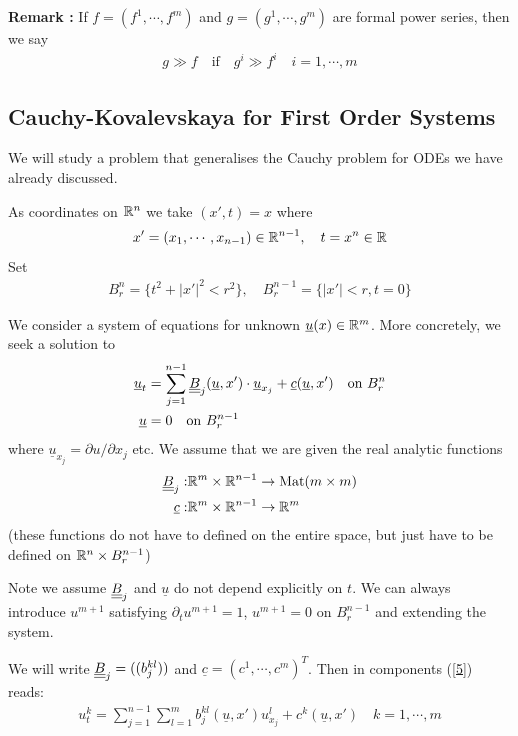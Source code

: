 \documentclass[12pt,a4paper]{report}
\begin{document}
\textbf{Remark :} If $f = (f^1, \cdots, f^m)$ and $g =(g^1, \cdots, g^m)$ are formal power series, then we say
\begin{align*}
g\gg f \quad \text{if} \quad g^i \gg f^i \quad i=1,\cdots,m
\end{align*}
\s

\subsection*{Cauchy-Kovalevskaya for First Order Systems}
We will study a problem that generalises the Cauchy problem for ODEs we have already discussed.
\s

As coordinates on $\mathbb{R}^n$ we take $(x',t) = x$ where
\begin{align*}
x'=(x_1,\cdots,x_{n-1}) \in \mathbb{R}^{n-1}, \quad t=x^n \in \mathbb{R}
\end{align*}
Set
\begin{align*}
B^n_r = \{t^2 +|x'|^2 <r^2 \}, \quad B_r^{n-1} = \{|x'|<r, t=0 \}
\end{align*}
\s

\renewcommand{\vec}{\underline}
We consider a system of equations for unknown $\vec{u}(x) \in \reals^m$. More concretely, we seek a solution to
\begin{align} 
\vec{u}_t &= \sum_{j=1}^{n-1} \doubleunderline{B}_j (\vec{u},x') \cdot \vec{u}_{x_j} + \vec{c}(\vec{u},x') \quad \text{on } B_r^n \label{5} \\
\vec{u} &= 0 \quad \text{on } B_r^{n-1} \nonumber
\end{align}
where $\vec{u}_{x_j}=\partial u/\partial x_j$ etc. We assume that we are given the real analytic functions
\begin{align*}
\doubleunderline{B}_j :& \reals^m \times \reals^{n-1} \rightarrow \text{Mat}(m\times m) \\
\vec{c} :& \reals^m \times \reals^{n-1} \rightarrow \reals^m
\end{align*}
(these functions do not have to defined on the entire space, but just have to be defined on $\mathbb{R}^n \times B^{n-1}_r$)

Note we assume $\underline{\underline{B}}_j$ and $\vec{u}$ do not depend explicitly on $t$. We can always introduce $u^{m+1}$ satisfying $\partial_t u^{m+1} =1$, $u^{m+1} =0$ on $B_r^{n-1}$ and extending the system.

\quad We will write $\underline{\underline{B}}_j = ((b_j^{kl}))$ and $\vec{c}  = (c^1, \cdots, c^m)^T$. Then in components (\ref{5}) reads:
\begin{align*}
u_t^k = \sum_{j=1}^{n-1} \sum_{l=1}^m b_j^{kl}(\vec{u},x')u_{x_j}^l + c^k(\vec{u},x') \quad k=1,\cdots, m
\end{align*}
\s
\end{document}
